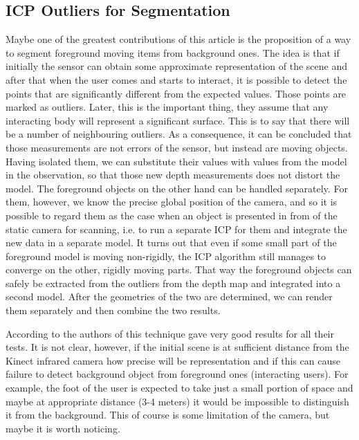 \documentclass[11pt, a4paper]{article}
\theoremstyle{plain}
\begin{document}
  \subsection{ICP Outliers for Segmentation} %
  \label{sub:ICP Outliers for Segmentation}
    Maybe one of the greatest contributions of this article is the proposition
    of a way to segment foreground moving items from background ones. The idea
    is that if initially the sensor can obtain some approximate representation
    of the scene and after that when the user comes and starts to interact, it
    is possible to detect the points that are significantly different from the
    expected values. Those points are marked as outliers. Later, this is the
    important thing, they assume that any interacting body will represent a
    significant surface. This is to say that there will be a number of
    neighbouring outliers. As a consequence, it can be concluded that those
    measurements are not errors of the sensor, but instead are moving objects.
    Having isolated them, we can substitute their values with values from the
    model in the observation, so that those new depth measurements does not
    distort the model.  The foreground objects on the other hand can be handled
    separately. For them, however, we know the precise global position of
    the camera, and so it is possible to regard them as the case when an object
    is presented in from of the static camera for scanning, i.e. to run a
    separate ICP for them and integrate the new data in a separate model. It
    turns out that even if some small part of the foreground model is moving
    non-rigidly, the ICP algorithm still manages to converge on the other,
    rigidly moving parts. That way the foreground objects can safely be
    extracted from the outliers from the depth map and integrated into a second
    model. After the geometries of the two are determined, we can render them
    separately and then combine the two results.

    According to the authors of \cite{kinectfusion} this technique gave very
    good results for all their tests. It is not clear, however, if the initial
    scene is at sufficient distance from the Kinect infrared camera how precise
    will be representation and if this can cause failure to detect background
    object from foreground ones (interacting users). For example, the foot of
    the user is expected to take just a small portion of space and maybe at
    appropriate distance (3-4 meters) it would be impossible to distinguish it
    from the background. This of course is some limitation of the camera, but
    maybe it is worth noticing.
\end{document}
